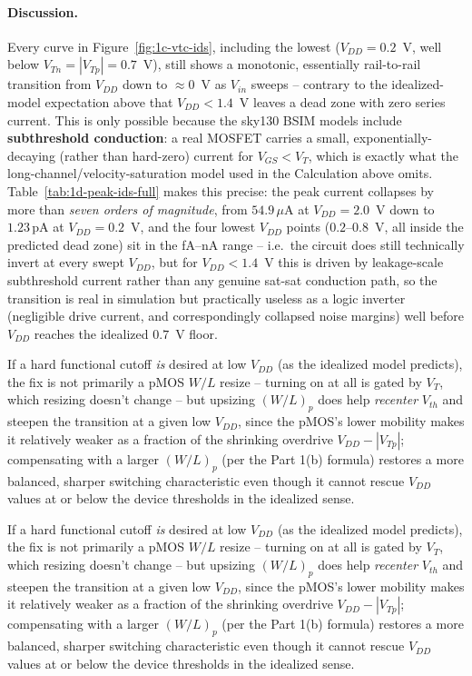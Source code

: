 \paragraph{Discussion.} Every curve in Figure~\ref{fig:1c-vtc-ids}, including
the lowest ($V_{DD}=0.2$~V, well below $V_{Tn}=|V_{Tp}|=0.7$~V), still shows a
monotonic, essentially rail-to-rail transition from $V_{DD}$ down to
$\approx0$~V as $V_{in}$ sweeps -- contrary to the idealized-model expectation
above that $V_{DD}<1.4$~V leaves a dead zone with zero series current. This is
only possible because the sky130 BSIM models include \textbf{subthreshold
conduction}: a real MOSFET carries a small, exponentially-decaying (rather than
hard-zero) current for $V_{GS}<V_T$, which is exactly what the
long-channel/velocity-saturation model used in the Calculation above omits.
Table~\ref{tab:1d-peak-ids-full} makes this precise: the peak current collapses
by more than \emph{seven orders of magnitude}, from $54.9\,\mu\text{A}$ at
$V_{DD}=2.0$~V down to $1.23\,\text{pA}$ at $V_{DD}=0.2$~V, and the four lowest
$V_{DD}$ points ($0.2$--$0.8$~V, all inside the predicted dead zone) sit in the
fA--nA range -- i.e.\ the circuit does still technically invert at every swept
$V_{DD}$, but for $V_{DD}<1.4$~V this is driven by leakage-scale subthreshold
current rather than any genuine sat-sat conduction path, so the transition is
real in simulation but practically useless as a logic inverter (negligible drive
current, and correspondingly collapsed noise margins) well before $V_{DD}$
reaches the idealized $0.7$~V floor.

If a hard functional cutoff \emph{is} desired at low $V_{DD}$ (as the idealized
model predicts), the fix is not primarily a pMOS $W/L$ resize -- turning on at
all is gated by $V_T$, which resizing doesn't change -- but upsizing $(W/L)_p$
does help \emph{recenter} $V_{th}$ and steepen the transition at a given low
$V_{DD}$, since the pMOS's lower mobility makes it relatively weaker as a
fraction of the shrinking overdrive $V_{DD}-|V_{Tp}|$; compensating with a
larger $(W/L)_p$ (per the Part 1(b) formula) restores a more balanced, sharper
switching characteristic even though it cannot rescue $V_{DD}$ values at or
below the device thresholds in the idealized sense.

If a hard functional cutoff \emph{is} desired at low $V_{DD}$ (as the idealized
model predicts), the fix is not primarily a pMOS $W/L$ resize -- turning on at
all is gated by $V_T$, which resizing doesn't change -- but upsizing $(W/L)_p$
does help \emph{recenter} $V_{th}$ and steepen the transition at a given low
$V_{DD}$, since the pMOS's lower mobility makes it relatively weaker as a
fraction of the shrinking overdrive $V_{DD}-|V_{Tp}|$; compensating with a
larger $(W/L)_p$ (per the Part 1(b) formula) restores a more balanced, sharper
switching characteristic even though it cannot rescue $V_{DD}$ values at or
below the device thresholds in the idealized sense.

